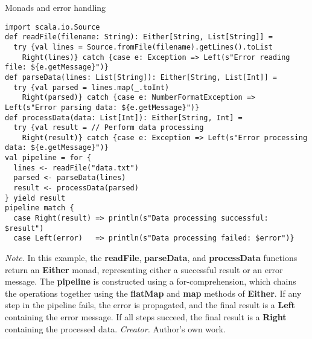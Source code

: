 \begin{table}[H]
\caption{Monads and error handling}
\begin{lstlisting}
import scala.io.Source
def readFile(filename: String): Either[String, List[String]] =
  try {val lines = Source.fromFile(filename).getLines().toList
    Right(lines)} catch {case e: Exception => Left(s"Error reading file: ${e.getMessage}")}
def parseData(lines: List[String]): Either[String, List[Int]] =
  try {val parsed = lines.map(_.toInt)
    Right(parsed)} catch {case e: NumberFormatException => Left(s"Error parsing data: ${e.getMessage}")}
def processData(data: List[Int]): Either[String, Int] =
  try {val result = // Perform data processing
    Right(result)} catch {case e: Exception => Left(s"Error processing data: ${e.getMessage}")}
val pipeline = for {
  lines <- readFile("data.txt")
  parsed <- parseData(lines)
  result <- processData(parsed)
} yield result
pipeline match {
  case Right(result) => println(s"Data processing successful: $result")
  case Left(error)   => println(s"Data processing failed: $error")}
\end{lstlisting}
\small
\textit{Note.} In this example, the \textbf{readFile}, \textbf{parseData}, and \textbf{processData} functions return an \textbf{Either} monad, representing either a successful result or an error message. The \textbf{pipeline} is constructed using a for-comprehension, which chains the operations together using the \textbf{flatMap} and \textbf{map} methods of \textbf{Either}. If any step in the pipeline fails, the error is propagated, and the final result is a \textbf{Left} containing the error message. If all steps succeed, the final result is a \textbf{Right} containing the processed data.
\textit{Creator.} Author's own work.
\end{table}

